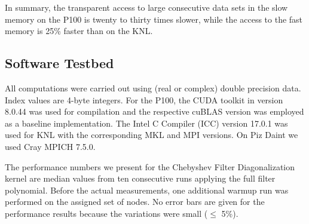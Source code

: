 \documentclass[letterpaper]{llncs}
\newcommand{\byte}{\mbox{byte}\xspace}
\begin{document}
In summary, the transparent access to large consecutive data sets in the slow memory on the P100 is twenty to thirty times slower, while the access to the fast memory is 25\% faster than on the KNL.



\subsection{Software Testbed}

All computations were carried out using (real or complex) double precision data.
Index values are 4-\byte integers. For the P100, the CUDA toolkit 
in version 8.0.44 was used for compilation and the respective cuBLAS version was
employed as a baseline implementation. The Intel C Compiler (ICC) version 17.0.1 was 
used for KNL with the corresponding MKL and MPI versions. On Piz Daint we used
Cray MPICH 7.5.0.

The performance numbers we present for the Chebyshev
Filter Diagonalization kernel are median values from ten consecutive
runs applying the full filter
polynomial. Before the actual measurements, one additional
warmup run was performed on the assigned set of nodes. No error bars are given for the
performance results because the variations were small ($\le$ 5\%).
\end{document}

